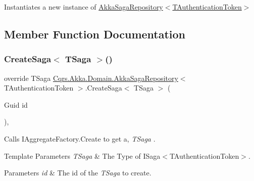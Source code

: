 Instantiates a new instance of \hyperlink{classCqrs_1_1Akka_1_1Domain_1_1AkkaSagaRepository_a69f3c0de994f3e966f6ee475482af5f5_a69f3c0de994f3e966f6ee475482af5f5}{Akka\+Saga\+Repository$<$\+T\+Authentication\+Token$>$} 



\subsection{Member Function Documentation}
\mbox{\label{classCqrs_1_1Akka_1_1Domain_1_1AkkaSagaRepository_a2c7263d0e58d2b31149ec685d5be934a_a2c7263d0e58d2b31149ec685d5be934a}} 
\subsubsection{\texorpdfstring{Create\+Saga$<$ T\+Saga $>$()}{CreateSaga< TSaga >()}}
{\footnotesize\ttfamily override T\+Saga \hyperlink{classCqrs_1_1Akka_1_1Domain_1_1AkkaSagaRepository}{Cqrs.\+Akka.\+Domain.\+Akka\+Saga\+Repository}$<$ T\+Authentication\+Token $>$.Create\+Saga$<$ T\+Saga $>$ (\begin{DoxyParamCaption}\item[{Guid}]{id }\end{DoxyParamCaption})\hspace{0.3cm}{\ttfamily [protected]}, {\ttfamily [virtual]}}



Calls I\+Aggregate\+Factory.\+Create to get a, {\itshape T\+Saga} . 


\begin{DoxyTemplParams}{Template Parameters}
{\em T\+Saga} & The Type of I\+Saga$<$\+T\+Authentication\+Token$>$.\\
\hline
\end{DoxyTemplParams}

\begin{DoxyParams}{Parameters}
{\em id} & The id of the {\itshape T\+Saga}  to create.\\
\hline
\end{DoxyParams}


